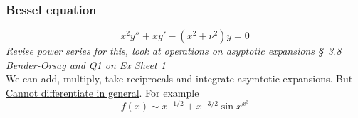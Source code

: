 \documentclass{article}
\begin{document}
\subsubsection*{Bessel equation}
\[ x^2 y'' + xy' - (x^2+\nu^2)y =0 \]
\emph{Revise power series for this, look at operations on asyptotic
expansions \S\ 3.8 Bender-Orsag and Q1 on Ex Sheet 1 }
\\
We can add, multiply, take reciprocals and integrate asymtotic expansions.
But \underline{Cannot differentiate in general}. For example
\[ f(x) \sim x^{-1/2} + x^{-3/2} \sin x^{x^3} \]
\end{document}

